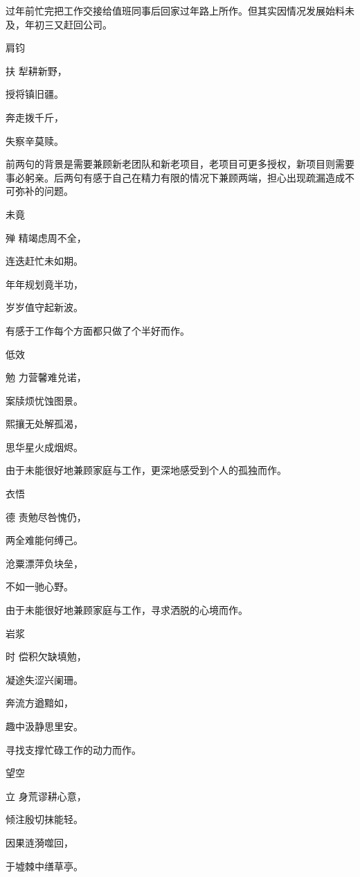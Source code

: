 \documentclass{article}
\newenvironment{poem}[3]{
\begin{minipage}{\textwidth}
\begin{pinyinscope}\begin{center}\Large\linespread{1.4}\selectfont #2\end{center}\end{pinyinscope}
\begin{pinyinscope}
	\begin{center}
	\Large\linespread{1.4}\rmfamily\selectfont #3
}{\end{center}
\end{pinyinscope}
\end{minipage}
}
\begin{document}
过年前忙完把工作交接给值班同事后回家过年路上所作。但其实因情况发展始料未及，年初三又赶回公司。

\begin{poem}{}{肩钧}
扶犁耕新野，

授将镇旧疆。

奔走拨千斤，

失察辛莫赎。
\end{poem}

前两句的背景是需要兼顾新老团队和新老项目，老项目可更多授权，新项目则需要事必躬亲。后两句有感于自己在精力有限的情况下兼顾两端，担心出现疏漏造成不可弥补的问题。

\begin{poem}{}{未竟}
殚精竭虑周不全，

连迭赶忙未如期。

年年规划竟半功，

岁岁值守起新波。
\end{poem}

有感于工作每个方面都只做了个半好而作。

\begin{poem}{}{低效}
勉力营馨难兑诺，

案牍烦忧蚀图景。

熙攘无处解孤渴，

思华星火成烟烬。
\end{poem}

由于未能很好地兼顾家庭与工作，更深地感受到个人的孤独而作。

\begin{poem}{}{衣悟}
德责勉尽咎愧仍，

两全难能何缚己。

沧粟漂萍负块垒，

不如一{}驰心野。
\end{poem}

由于未能很好地兼顾家庭与工作，寻求洒脱的心境而作。

\begin{poem}{}{岩浆}
时偿积欠缺填勉，

凝途失涩兴阑珊。

奔流方遒黯如{}，

趣中汲静思里安。
\end{poem}

寻找支撑忙碌工作的动力而作。

\begin{poem}{}{望空}
立身荒谬耕心意，

倾注殷切抹能轻。

因果涟漪噬回{}，

于墟棘中缮草亭。
\end{poem}
\end{document}
